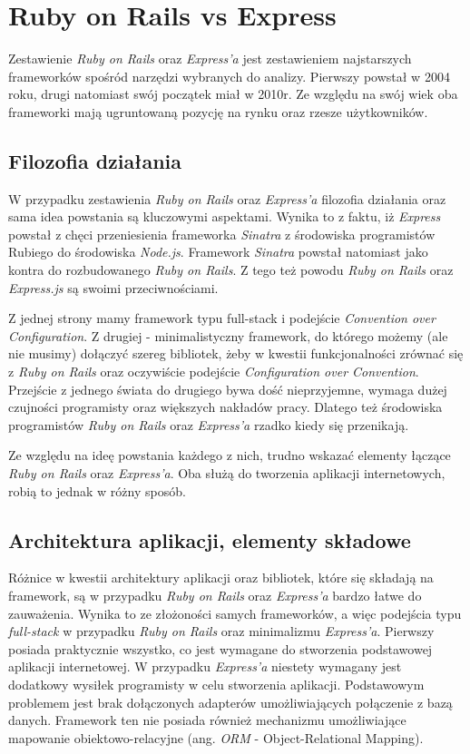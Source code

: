 \section{Ruby on Rails vs Express}
Zestawienie \textit{Ruby on Rails} oraz \textit{Express'a} jest zestawieniem najstarszych frameworków spośród narzędzi wybranych do analizy. Pierwszy powstał w 2004 roku, drugi natomiast swój początek miał w 2010r. Ze względu na swój wiek oba frameworki mają ugruntowaną pozycję na rynku oraz rzesze użytkowników.

\subsection{Filozofia działania}
W przypadku zestawienia \textit{Ruby on Rails} oraz \textit{Express'a} filozofia działania oraz sama idea powstania są kluczowymi aspektami. Wynika to z faktu, iż \textit{Express} powstał z chęci przeniesienia frameworka \textit{Sinatra} z środowiska programistów Rubiego do środowiska \textit{Node.js}. Framework \textit{Sinatra} powstał natomiast jako kontra do rozbudowanego \textit{Ruby on Rails}. Z tego też powodu \textit{Ruby on Rails} oraz \textit{Express.js} są swoimi przeciwnościami.

Z jednej strony mamy framework typu full-stack i podejście \textit{Convention over Configuration}. Z drugiej - minimalistyczny framework, do którego możemy (ale nie musimy) dołączyć szereg bibliotek, żeby w kwestii funkcjonalności zrównać się z \textit{Ruby on Rails} oraz oczywiście podejście \textit{Configuration over Convention}. Przejście z jednego świata do drugiego bywa dość nieprzyjemne, wymaga dużej czujności programisty oraz większych nakładów pracy. Dlatego też środowiska programistów \textit{Ruby on Rails} oraz \textit{Express'a} rzadko kiedy się przenikają.

Ze względu na ideę powstania każdego z nich, trudno wskazać elementy łączące \textit{Ruby on Rails} oraz \textit{Express'a}. Oba służą do tworzenia aplikacji internetowych, robią to jednak w różny sposób.

\subsection{Architektura aplikacji, elementy składowe}
\label{rails_express:architektura}
Różnice w kwestii architektury aplikacji oraz bibliotek, które się składają na framework, są w przypadku \textit{Ruby on Rails} oraz \textit{Express'a} bardzo łatwe do zauważenia. Wynika to ze złożoności samych frameworków, a więc podejścia typu \textit{full-stack} w przypadku \textit{Ruby on Rails} oraz minimalizmu \textit{Express'a}. Pierwszy posiada praktycznie wszystko, co jest wymagane do stworzenia podstawowej aplikacji internetowej. W przypadku \textit{Express'a} niestety wymagany jest dodatkowy wysiłek programisty w celu stworzenia aplikacji. Podstawowym problemem jest brak dołączonych adapterów umożliwiających połączenie z bazą danych. Framework ten nie posiada również mechanizmu umożliwiające mapowanie obiektowo-relacyjne (ang. \textit{ORM} - Object-Relational Mapping).

